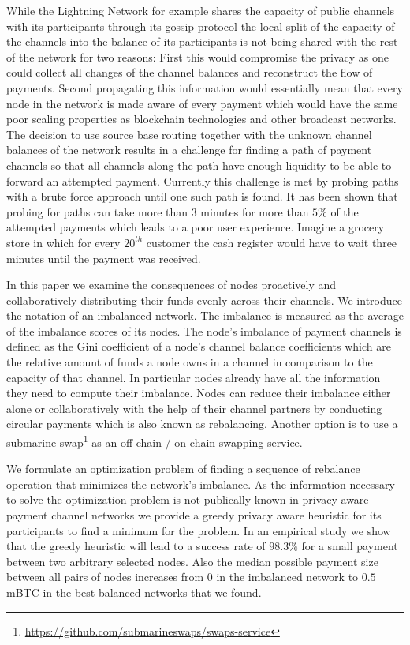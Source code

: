 \documentclass[a4paper]{paper}
\begin{document}
While the Lightning Network for example shares the capacity of public channels with its participants through its gossip protocol the local split of the capacity of the channels into the balance of its participants is not being shared with the rest of the network for two reasons:
First this would compromise the privacy as one could collect all changes of the channel balances and reconstruct the flow of payments.
Second propagating this information would essentially mean that every node in the network is made aware of every payment which would have the same poor scaling properties as blockchain technologies and other broadcast networks.
The decision to use source base routing together with the unknown channel balances of the network results in a challenge for finding a path of payment channels so that all channels along the path have enough liquidity to be able to forward an attempted payment.
Currently this challenge is met by probing paths with a brute force approach until one such path is found.
It has been shown that probing for paths can take more than 3 minutes for more than $5\%$ of the attempted payments \cite{decker2019lnconf} which leads to a poor user experience.
Imagine a grocery store in which for every $20^{th}$ customer the cash register would have to wait three minutes until the payment was received.

In this paper we examine the consequences of nodes proactively and collaboratively distributing their funds evenly across their channels.
We introduce the notation of an imbalanced network.
The imbalance is measured as the average of the imbalance scores of its nodes.
The node's imbalance of payment channels is defined as the Gini coefficient of a node's channel balance coefficients which are the relative amount of funds a node owns in a channel in comparison to the capacity of that channel.
In particular nodes already have all the information they need to compute their imbalance. 
Nodes can reduce their imbalance either alone or collaboratively with the help of their channel partners by conducting circular payments which is also known as rebalancing.
Another option is to use a submarine swap\footnote{\url{https://github.com/submarineswaps/swaps-service}} as an off-chain / on-chain swapping service.

We formulate an optimization problem of finding a sequence of rebalance operation that minimizes the network's imbalance.
As the information necessary to solve the optimization problem is not publically known in privacy aware payment channel networks we provide a greedy privacy aware heuristic for its participants to find a minimum for the problem. 
In an empirical study we show that the greedy heuristic will lead to a success rate of $98.3\%$ for a small payment between two arbitrary selected nodes.
Also the median possible payment size between all pairs of nodes increases from $0$ in the imbalanced network to $0.5$ mBTC in the best balanced networks that we found.
\end{document}
